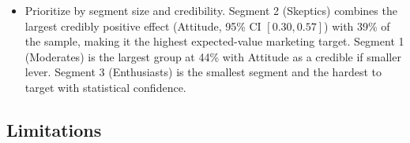 \documentclass[11pt]{article}
\begin{document}
\begin{itemize}
        posterior signal is on Flexibility ($\bar{\beta} = 0.40$,
        $P(\beta > 0) = 0.92$), which is consistent with prior
        literature ranking Flexibility highly, so messaging around
        control, customization, and choice of repayment schedule is
        the most defensible target. The recommendation is
        directional rather than statistically credible, and
        acquisition spend should be sized accordingly.
  \item Prioritize by segment size and credibility. Segment 2
        (Skeptics) combines the largest credibly positive effect
        (Attitude, 95\% CI $[0.30, 0.57]$) with 39\% of the sample,
        making it the highest expected-value marketing target.
        Segment 1 (Moderates) is the largest group at 44\% with
        Attitude as a credible if smaller lever. Segment 3
        (Enthusiasts) is the smallest segment and the hardest to
        target with statistical confidence.
\end{itemize}

\subsection{Limitations}
\end{document}
